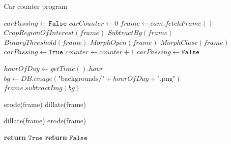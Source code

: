 \begin{algorithm}
    \caption{Car counter program}\label{carCounterProg}
    \begin{algorithmic}[1]
            \State $ carPassing \leftarrow \texttt{False} $
            \State $ carCounter \leftarrow 0 $
            \Loop
                \State $ frame \leftarrow cam.fetchFrame() $
                \State $ CropRegionOfInterest(frame) $ 
                \State $ SubtractBg(frame) $
                \State $ BinaryThreshold(frame) $
                \State $ MorphOpen(frame) $
                \State $ MorphClose(frame) $
                        \State $ carPassing \leftarrow \texttt{True} $
                        \State $ counter \leftarrow counter + 1 $
                    \EndIf
                    \State $ carPassing \leftarrow \texttt{False} $
                \EndIf
            \EndLoop
        \EndProcedure

        \Statex

            \State $ hourOfDay \leftarrow getTime().hour $
            \State $ bg \leftarrow DB.image(\text{"backgrounds/"} + hourOfDay + \text{".png"}) $
            \State $ frame.subtractImg(bg) $
        \EndFunction

        \Statex

            \State erode(frame)
            \State dillate(frame)
        \EndFunction

        \Statex

            \State dillate(frame)
            \State erode(frame)
        \EndFunction

        \Statex

                        \State \textbf{return} $ \texttt{True} $
                    \EndIf
                \EndFor
            \EndFor
            \State \textbf{return} $ \texttt{False} $
        \EndFunction
    \end{algorithmic}
\end{algorithm}

\clearpage

